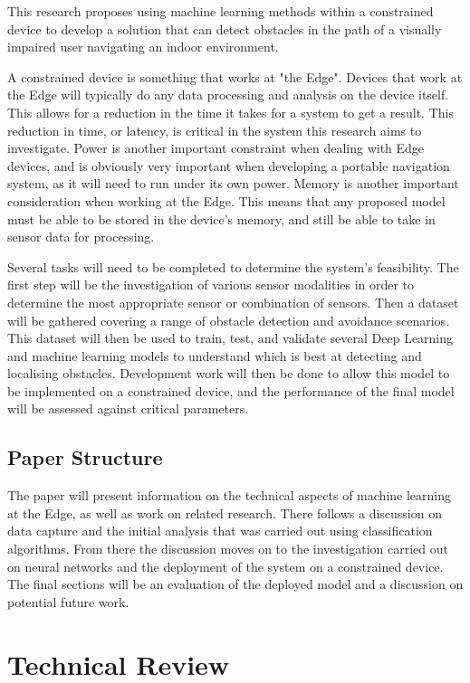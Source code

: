 \documentclass{svproc}
\begin{document}
This research proposes using machine learning methods within a constrained device to develop a solution that can 
detect obstacles in the path of a visually impaired user navigating an indoor environment. 

A constrained device is something that works at "the Edge". Devices that work at the Edge will typically do any 
data processing and analysis on the device itself. This allows for a reduction in the time it takes for a system to get a result. 
This reduction in time, or latency, is critical in the system this research aims to investigate. 
Power is another important constraint when dealing with Edge devices, and is obviously very important when 
developing a portable navigation system, as it will need to run under its own power. 
Memory is another important consideration when working at the Edge. This means that any proposed model 
must be able to be stored in the device's memory, and still be able to take in sensor data for processing. 

Several tasks will need to be completed to determine the system's feasibility. The first step will be the investigation 
of various sensor modalities in order to determine the most appropriate sensor or combination of sensors. 
Then a dataset will be gathered covering a range of obstacle detection and avoidance scenarios. This dataset will then 
be used to train, test, and validate several Deep Learning and machine learning models to understand which is 
best at detecting and localising obstacles. Development work will then be done to allow this model to be implemented on a 
constrained device, and the performance of the final model will be assessed against critical parameters.

\subsection{Paper Structure}
The paper will present information on the technical aspects of machine learning at the Edge, as well as work on related research. 
There follows a discussion on data capture and the initial analysis that was carried out using classification algorithms. From there 
the discussion moves on to the investigation carried out on neural networks and the deployment of the system on a constrained device. 
The final sections will be an evaluation of the deployed model and a discussion on potential future work.

\section{Technical Review}
\end{document}
